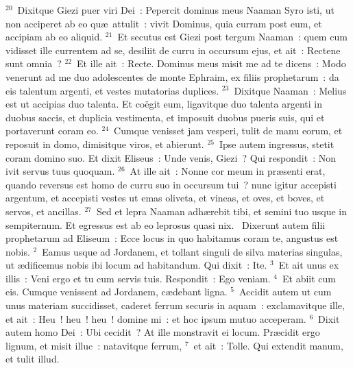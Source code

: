 ${}^{20}$~Dixitque Giezi puer viri Dei~: Pepercit dominus meus Naaman Syro isti, ut non acciperet ab eo qu\ae\ attulit~: vivit Dominus, quia curram post eum, et accipiam ab eo aliquid.
${}^{21}$~Et secutus est Giezi post tergum Naaman~: quem cum vidisset ille currentem ad se, desiliit de curru in occursum ejus, et ait~: Rectene sunt omnia~?
${}^{22}$~Et ille ait~: Recte. Dominus meus misit me ad te dicens~: Modo venerunt ad me duo adolescentes de monte Ephraim, ex filiis prophetarum~: da eis talentum argenti, et vestes mutatorias duplices.
${}^{23}$~Dixitque Naaman~: Melius est ut accipias duo talenta. Et co\"egit eum, ligavitque duo talenta argenti in duobus saccis, et duplicia vestimenta, et imposuit duobus pueris suis, qui et portaverunt coram eo.
${}^{24}$~Cumque venisset jam vesperi, tulit de manu eorum, et reposuit in domo, dimisitque viros, et abierunt.
${}^{25}$~Ipse autem ingressus, stetit coram domino suo. Et dixit Eliseus~: Unde venis, Giezi~? Qui respondit~: Non ivit servus tuus quoquam.
${}^{26}$~At ille ait~: Nonne cor meum in pr\ae senti erat, quando reversus est homo de curru suo in occursum tui~? nunc igitur accepisti argentum, et accepisti vestes ut emas oliveta, et vineas, et oves, et boves, et servos, et ancillas.
${}^{27}$~Sed et lepra Naaman adh\ae rebit tibi, et semini tuo usque in sempiternum. Et egressus est ab eo leprosus quasi nix.
~Dixerunt autem filii prophetarum ad Eliseum~: Ecce locus in quo habitamus coram te, angustus est nobis.
${}^{2}$~Eamus usque ad Jordanem, et tollant singuli de silva materias singulas, ut \ae dificemus nobis ibi locum ad habitandum. Qui dixit~: Ite.
${}^{3}$~Et ait unus ex illis~: Veni ergo et tu cum servis tuis. Respondit~: Ego veniam.
${}^{4}$~Et abiit cum eis. Cumque venissent ad Jordanem, c\ae debant ligna.
${}^{5}$~Accidit autem ut cum unus materiam succidisset, caderet ferrum securis in aquam~: exclamavitque ille, et ait~: Heu~! heu~! heu~! domine mi~: et hoc ipsum mutuo acceperam.
${}^{6}$~Dixit autem homo Dei~: Ubi cecidit~? At ille monstravit ei locum. Pr\ae cidit ergo lignum, et misit illuc~: natavitque ferrum,
${}^{7}$~et ait~: Tolle. Qui extendit manum, et tulit illud.


